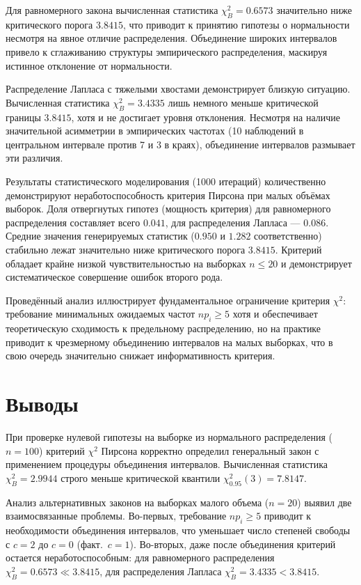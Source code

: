 \documentclass[a4paper, 14pt]{extarticle}
\begin{document}
Для равномерного закона вычисленная статистика $\chi^2_{\textit{B}} = 0.6573$ значительно ниже критического порога $3.8415$, что приводит к принятию гипотезы о нормальности несмотря на явное отличие распределения. Объединение широких интервалов привело к сглаживанию структуры эмпирического распределения, маскируя истинное отклонение от нормальности.

Распределение Лапласа с тяжелыми хвостами демонстрирует близкую ситуацию. Вычисленная статистика $\chi^2_{\textit{B}} = 3.4335$ лишь немного меньше критической границы $3.8415$, хотя и не достигает уровня отклонения. Несмотря на наличие значительной асимметрии в эмпирических частотах (10 наблюдений в центральном интервале против 7 и 3 в краях), объединение интервалов размывает эти различия.

Результаты статистического моделирования (1000 итераций) количественно демонстрируют неработоспособность критерия Пирсона при малых объёмах выборок. Доля отвергнутых гипотез (мощность критерия) для равномерного распределения составляет всего $0.041$, для распределения Лапласа — $0.086$. Средние значения генерируемых статистик ($0.950$ и $1.282$ соответственно) стабильно лежат значительно ниже критического порога $3.8415$. Критерий обладает крайне низкой чувствительностью на выборках $n \le 20$ и демонстрирует систематическое совершение ошибок второго рода.

Проведённый анализ иллюстрирует фундаментальное ограничение критерия $\chi^2$: требование минимальных ожидаемых частот $np_i \ge 5$ хотя и обеспечивает теоретическую сходимость к предельному распределению, но на практике приводит к чрезмерному объединению интервалов на малых выборках, что в свою очередь значительно снижает информативность критерия.

\section{Выводы}

При проверке нулевой гипотезы на выборке из нормального распределения ($n=100$) критерий $\chi^2$ Пирсона корректно определил генеральный закон с применением процедуры объединения интервалов. Вычисленная статистика $\chi^2_{\textit{B}} = 2.9944$ строго меньше критической квантили $\chi^2_{0.95}(3) = 7.8147$.

Анализ альтернативных законов на выборках малого объема ($n=20$) выявил две взаимосвязанные проблемы. Во-первых, требование $np_i \ge 5$ приводит к необходимости объединения интервалов, что уменьшает число степеней свободы с $c=2$ до $c=0$ (факт.~$c=1$). Во-вторых, даже после объединения критерий остается неработоспособным: для равномерного распределения $\chi^2_{\textit{B}} = 0.6573 \ll 3.8415$, для распределения Лапласа $\chi^2_{\textit{B}} = 3.4335 < 3.8415$.
\end{document}
